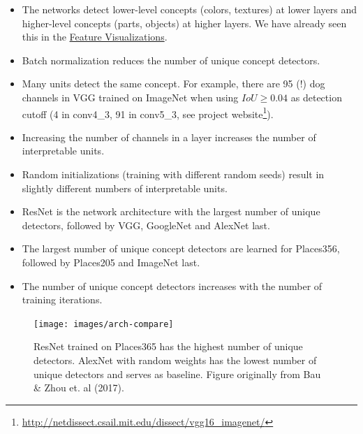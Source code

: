 \documentclass[
  12pt,
]{krantz}
\providecommand{\tightlist}{%
  \setlength{\itemsep}{0pt}\setlength{\parskip}{0pt}}
\renewcommand{\href}[2]{#2\footnote{\url{#1}}}
\begin{document}
\begin{itemize}
\tightlist
\item
  The networks detect lower-level concepts (colors, textures) at lower layers and higher-level concepts (parts, objects) at higher layers.
  We have already seen this in the \protect\hyperlink{feature-visualization}{Feature Visualizations}.
\item
  Batch normalization reduces the number of unique concept detectors.
\item
  Many units detect the same concept.
  For example, there are 95 (!) dog channels in VGG trained on ImageNet when using \(IoU \geq 0.04\) as detection cutoff (4 in conv4\_3, 91 in conv5\_3, see \href{http://netdissect.csail.mit.edu/dissect/vgg16_imagenet/}{project website}).
\item
  Increasing the number of channels in a layer increases the number of interpretable units.
\item
  Random initializations (training with different random seeds) result in slightly different numbers of interpretable units.
\item
  ResNet is the network architecture with the largest number of unique detectors, followed by VGG, GoogleNet and AlexNet last.
\item
  The largest number of unique concept detectors are learned for Places356, followed by Places205 and ImageNet last.
\item
  The number of unique concept detectors increases with the number of training iterations.
\end{itemize}

\begin{figure}

{\centering \texttt{[image: images/arch-compare]} 

}

\caption{ResNet trained on Places365 has the highest number of unique detectors. AlexNet with random weights has the lowest number of unique detectors and serves as baseline. Figure originally from Bau \& Zhou et. al (2017).}\label{fig:unnamed-chunk-58}
\end{figure}
\end{document}
